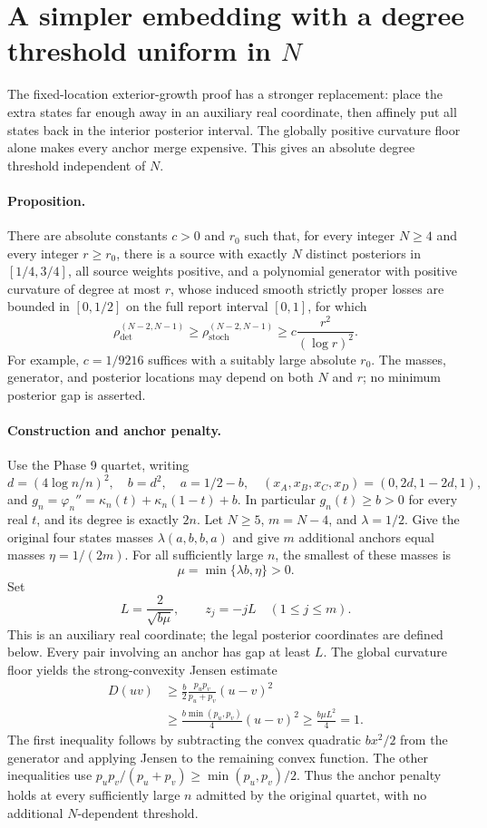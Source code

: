\section{A simpler embedding with a degree threshold uniform in $N$}

The fixed-location exterior-growth proof has a stronger replacement:
place the extra states far enough away in an auxiliary real coordinate,
then affinely put all states back in the interior posterior interval.
The globally positive curvature floor alone makes every anchor merge
expensive. This gives an absolute degree threshold independent of $N$.

\paragraph{Proposition.}
There are absolute constants $c>0$ and $r_0$ such that, for every integer
$N\ge4$ and every integer $r\ge r_0$, there is a source with exactly
$N$ distinct posteriors in $[1/4,3/4]$, all source weights positive,
and a polynomial generator with positive curvature of degree at most
$r$, whose induced smooth strictly proper losses are bounded in
$[0,1/2]$ on the full report interval $[0,1]$, for which
\[
 \rho_{\mathrm{det}}^{(N-2,N-1)}
 \ge\rho_{\mathrm{stoch}}^{(N-2,N-1)}
 \ge c\frac{r^2}{(\log r)^2}.
\]
For example, $c=1/9216$ suffices with a suitably large absolute $r_0$.
The masses, generator, and posterior locations may depend on both $N$
and $r$; no minimum posterior gap is asserted.

\paragraph{Construction and anchor penalty.}
Use the Phase 9 quartet, writing
\[
 d=(4\log n/n)^2,\quad b=d^2,\quad a=1/2-b,
 \quad (x_A,x_B,x_C,x_D)=(0,2d,1-2d,1),
\]
and $g_n=\varphi_n''=\kappa_n(t)+\kappa_n(1-t)+b$.
In particular $g_n(t)\ge b>0$ for every real $t$, and its degree is
exactly $2n$.
Let $N\ge5$, $m=N-4$, and $\lambda=1/2$. Give the original four
states masses $\lambda(a,b,b,a)$ and give $m$ additional anchors equal
masses $\eta=1/(2m)$. For all sufficiently large $n$, the smallest
of these masses is
\[
 \mu=\min\{\lambda b,\eta\}>0.
\]
Set
\[
 L=\frac2{\sqrt{b\mu}},\qquad
 z_j=-jL\quad(1\le j\le m).
\]
This is an auxiliary real coordinate; the legal posterior coordinates
are defined below. Every pair involving an anchor has gap at least $L$.
The global curvature floor yields the strong-convexity Jensen estimate
\begin{align*}
 D(uv)
 &\ge\frac b2\frac{p_up_v}{p_u+p_v}(u-v)^2\\
 &\ge\frac{b\min(p_u,p_v)}4(u-v)^2
 \ge\frac{b\mu L^2}4=1.
\end{align*}
The first inequality follows by subtracting the convex quadratic
$bx^2/2$ from the generator and applying Jensen to the remaining
convex function. The other inequalities use
$p_up_v/(p_u+p_v)\ge\min(p_u,p_v)/2$.
Thus the anchor penalty holds at every sufficiently large $n$ admitted
by the original quartet, with no additional $N$-dependent threshold.


